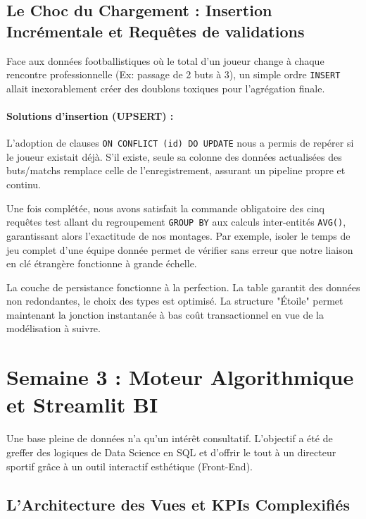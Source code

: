 \documentclass[11pt, a4paper]{article}
\begin{document}
\subsection{Le Choc du Chargement : Insertion Incrémentale et Requêtes de validations}

Face aux données footballistiques où le total d'un joueur change à chaque rencontre professionnelle (Ex: passage de 2 buts à 3), un simple ordre \texttt{INSERT} allait inexorablement créer des doublons toxiques pour l'agrégation finale. 

\paragraph{Solutions d'insertion (UPSERT) :}
L'adoption de clauses \texttt{ON CONFLICT (id) DO UPDATE} nous a permis de repérer si le joueur existait déjà. S'il existe, seule sa colonne des données actualisées des buts/matchs remplace celle de l'enregistrement, assurant un pipeline propre et continu.

Une fois complétée, nous avons satisfait la commande obligatoire des cinq requêtes test allant du regroupement \texttt{GROUP BY} aux calculs inter-entités \texttt{AVG()}, garantissant alors l'exactitude de nos montages. Par exemple, isoler le temps de jeu complet d'une équipe donnée permet de vérifier sans erreur que notre liaison en clé étrangère fonctionne à grande échelle.

\begin{tcolorbox}[colback=success!10,colframe=success!80!black,title=\textbf{Bilan et Validation - Semaine 2}]
    La couche de persistance fonctionne à la perfection. La table garantit des données non redondantes, le choix des types est optimisé. La structure "Étoile" permet maintenant la jonction instantanée à bas coût transactionnel en vue de la modélisation à suivre.
\end{tcolorbox}


\section{Semaine 3 : Moteur Algorithmique et Streamlit BI}

Une base pleine de données n'a qu'un intérêt consultatif. L’objectif a été de greffer des logiques de Data Science en SQL et d'offrir le tout à un directeur sportif grâce à un outil interactif esthétique (Front-End). 

\subsection{L'Architecture des Vues et KPIs Complexifiés}
\end{document}

